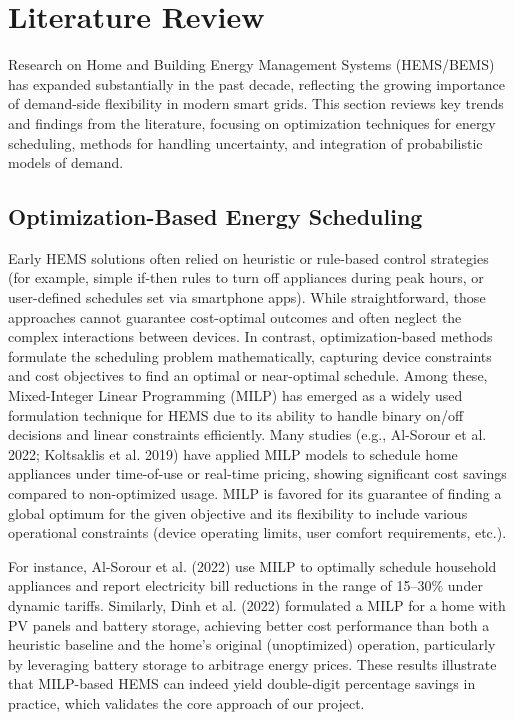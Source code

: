 \documentclass[12pt,a4paper]{article}
\begin{document}
\clearpage

\section{Literature Review}
Research on Home and Building Energy Management Systems (HEMS/BEMS) has expanded substantially in the past decade, reflecting the growing importance of demand-side flexibility in modern smart grids. This section reviews key trends and findings from the literature, focusing on optimization techniques for energy scheduling, methods for handling uncertainty, and integration of probabilistic models of demand.

\subsection{Optimization-Based Energy Scheduling}
Early HEMS solutions often relied on heuristic or rule-based control strategies (for example, simple if-then rules to turn off appliances during peak hours, or user-defined schedules set via smartphone apps). While straightforward, those approaches cannot guarantee cost-optimal outcomes and often neglect the complex interactions between devices. In contrast, optimization-based methods formulate the scheduling problem mathematically, capturing device constraints and cost objectives to find an optimal or near-optimal schedule. Among these, Mixed-Integer Linear Programming (MILP) has emerged as a widely used formulation technique for HEMS due to its ability to handle binary on/off decisions and linear constraints efficiently. Many studies (e.g., Al-Sorour et al. 2022; Koltsaklis et al. 2019) have applied MILP models to schedule home appliances under time-of-use or real-time pricing, showing significant cost savings compared to non-optimized usage. MILP is favored for its guarantee of finding a global optimum for the given objective and its flexibility to include various operational constraints (device operating limits, user comfort requirements, etc.). 

For instance, Al-Sorour et al. (2022) use MILP to optimally schedule household appliances and report electricity bill reductions in the range of 15–30\% under dynamic tariffs. Similarly, Dinh et al. (2022) formulated a MILP for a home with PV panels and battery storage, achieving better cost performance than both a heuristic baseline and the home’s original (unoptimized) operation, particularly by leveraging battery storage to arbitrage energy prices. These results illustrate that MILP-based HEMS can indeed yield double-digit percentage savings in practice, which validates the core approach of our project.
\end{document}
